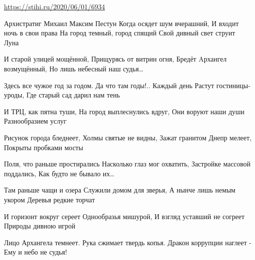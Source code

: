  
 
 
 
 
\url{https://stihi.ru/2020/06/01/6934}

Архистратиг Михаил
Максим Пестун
Когда осядет шум вчерашний,
И входит ночь в свои права
На город темный, город спящий
Свой дивный свет струит Луна

И старой улицей мощённой,
Прищурясь от витрин огня,
Бредёт Aрхангел возмущённый,
Но лишь небесный наш судья…

Здесь все чужое год за годом.
Да что там годы!..
Каждый день
Растут гостиницы-уроды,
Где старый сад дарил нам тень

И ТРЦ, как пятна туши,
На город выплеснулись вдруг,
Они воруют наши души
Разнообразием услуг

Рисунок города бледнеет,
Холмы святые не видны,
Зажат гранитом Днепр мелеет,
Покрыты пробками мосты

Поля, что раньше простирались
Насколько глаз мог охватить,
Застройке массовой поддались,
Как будто не бывало их…

Там раньше чащи и озера
Служили домом для зверья,
А нынче лишь немым укором
Деревья редкие торчат

И горизонт вокруг сереет
Однообразья мишурой,
И взгляд уставший не согреет
Природы дивною игрой

Лицо Архангела темнеет.
Рука сжимает твердь копья.
Дракон коррупции наглеет -
Ему и небо не судья!
